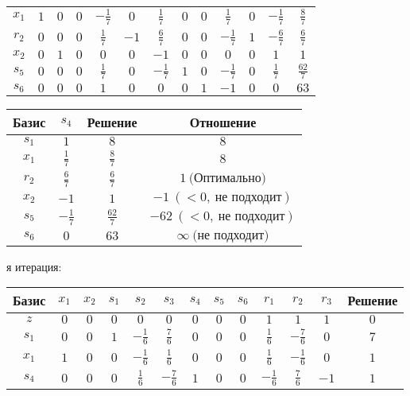 \documentclass{article}%
\begin{document}
\begin{flushleft}
\begin{tabular}{|c|ccccccccccc|c|}
$x_{1}$&$1$&$0$&$0$&$-\frac{1}{7}$&$0$&$\frac{1}{7}$&$0$&$0$&$\frac{1}{7}$&$0$&$-\frac{1}{7}$&$\frac{8}{7}$\\%
$r_{2}$&$0$&$0$&$0$&$\frac{1}{7}$&$-1$&$\frac{6}{7}$&$0$&$0$&$-\frac{1}{7}$&$1$&$-\frac{6}{7}$&$\frac{6}{7}$\\%
$x_{2}$&$0$&$1$&$0$&$0$&$0$&$-1$&$0$&$0$&$0$&$0$&$1$&$1$\\%
$s_{5}$&$0$&$0$&$0$&$\frac{1}{7}$&$0$&$-\frac{1}{7}$&$1$&$0$&$-\frac{1}{7}$&$0$&$\frac{1}{7}$&$\frac{62}{7}$\\%
$s_{6}$&$0$&$0$&$0$&$1$&$0$&$0$&$0$&$1$&$-1$&$0$&$0$&$63$\\%
\hline%
\end{tabular}%
\newline%
\newline%
\newline%
\begin{tabular}{|cccc|}%
\hline%
Базис&$s_{4}$&Решение&Отношение\\%
\hline%
$s_{1}$&$1$&$8$&$8$\\%
$x_{1}$&$\frac{1}{7}$&$\frac{8}{7}$&$8$\\%
$r_{2}$&$\frac{6}{7}$&$\frac{6}{7}$&$1\: \text{(Оптимально)}$\\%
$x_{2}$&$-1$&$1$&$-1\: (< 0, \: \text{не подходит})$\\%
$s_{5}$&$-\frac{1}{7}$&$\frac{62}{7}$&$-62\: (< 0, \: \text{не подходит})$\\%
$s_{6}$&$0$&$63$&$\infty \: \text{(не подходит)}$\\%
\hline%
\end{tabular}%
\newline%
\newline%
я итерация: %
\newline%
\newline%
\renewcommand{\arraystretch}{1.3}%
\begin{tabular}{|c|ccccccccccc|c|}%
\hline%
Базис&$x_{1}$&$x_{2}$&$s_{1}$&$s_{2}$&$s_{3}$&$s_{4}$&$s_{5}$&$s_{6}$&$r_{1}$&$r_{2}$&$r_{3}$&Решение\\%
\hline%
$z$&$0$&$0$&$0$&$0$&$0$&$0$&$0$&$0$&$1$&$1$&$1$&$0$\\%
\hline%
$s_{1}$&$0$&$0$&$1$&$-\frac{1}{6}$&$\frac{7}{6}$&$0$&$0$&$0$&$\frac{1}{6}$&$-\frac{7}{6}$&$0$&$7$\\%
$x_{1}$&$1$&$0$&$0$&$-\frac{1}{6}$&$\frac{1}{6}$&$0$&$0$&$0$&$\frac{1}{6}$&$-\frac{1}{6}$&$0$&$1$\\%
$s_{4}$&$0$&$0$&$0$&$\frac{1}{6}$&$-\frac{7}{6}$&$1$&$0$&$0$&$-\frac{1}{6}$&$\frac{7}{6}$&$-1$&$1$\\%

\end{tabular}
\end{flushleft}
\end{document}
